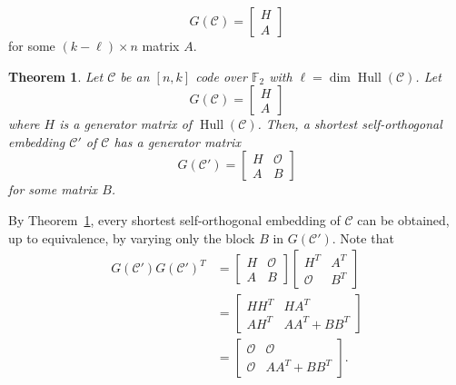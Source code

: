 \documentclass{article}
\newtheorem{theorem}{Theorem}
\newcommand{\rank}{\operatorname{rank}}
\newcommand{\Hull}{\operatorname{Hull}}
\begin{document}
\[
G(\mathcal{C}) = \begin{bmatrix}
    H \\ A
\end{bmatrix}
\]
for some $(k-\ell)\times n$ matrix $A$.
\begin{theorem}\label{zero-embedding}\cite{akklw-2025}
Let $\mathcal{C}$ be an $[n,k]$ code over $\mathbb{F}_2$ with $\ell=\dim\Hull(\mathcal{C})$. Let \[
G(\mathcal{C}) = \begin{bmatrix}
    H \\ A
\end{bmatrix}
\] where $H$ is a generator matrix of $\Hull(\mathcal{C})$. Then, a shortest self-orthogonal embedding $\mathcal{C}'$ of $\mathcal{C}$ has a generator matrix
\[
G(\mathcal{C}')=\begin{bmatrix}
    H & \mathcal{O}\\
    A & B
    \end{bmatrix}
\] for some matrix $B$.
\end{theorem}
By Theorem~\ref{zero-embedding}, every shortest self-orthogonal embedding of $\mathcal{C}$ can be obtained, up to equivalence, by varying only the block $B$ in $G(\mathcal{C}')$. Note that
\begin{align*}
    G(\mathcal{C}')G(\mathcal{C}')^T &= \begin{bmatrix}
    H & \mathcal{O}\\
    A & B
    \end{bmatrix}\begin{bmatrix}
    H^T & A^T\\
    \mathcal{O} & B^T
    \end{bmatrix}\\&=\begin{bmatrix}
    HH^T & HA^T\\
    AH^T & AA^T+BB^T
    \end{bmatrix}\\&=\begin{bmatrix}
    \mathcal{O} & \mathcal{O}\\
    \mathcal{O} & AA^T+BB^T
    \end{bmatrix}.
\end{align*}
\end{document}
